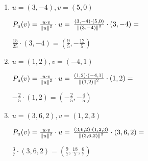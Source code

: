 \documentclass[../practica_01.tex]{subfiles}
\begin{document}
    \begin{enumerate}

        \item $u = (3,-4), v=(5,0)$

            $ P_{u}(v) = \frac{u \cdot v}{\norm*{u}^2}\cdot u = $
            $ \frac{(3,-4) \cdot (5,0)}{\norm*{(3,-4)}^2}\cdot (3,-4) =$

            $\frac{15}{25} \cdot (3,-4) = (\frac{9}{5},-\frac{12}{5})$

        \item $u = (1,2), v=(-4,1)$

            $ P_{u}(v) = \frac{u \cdot v}{\norm*{u}^2}\cdot u = $
            $ \frac{(1,2) \cdot (-4,1)}{\norm*{(1,2)}^2}\cdot (1,2) =$

            $-\frac{2}{5} \cdot (1,2) = (-\frac{2}{5},-\frac{4}{5})$

        \item $u = (3,6,2), v=(1,2,3)$

            $ P_{u}(v) = \frac{u \cdot v}{\norm*{u}^2}\cdot u = $
            $ \frac{(3,6,2) \cdot (1,2,3)}{\norm*{(3,6,2)}^2}\cdot (3,6,2) =$

            $\frac{3}{7} \cdot (3,6,2) = (\frac{9}{7},\frac{18}{7},\frac{6}{7})$

    \end{enumerate}
\end{document}
